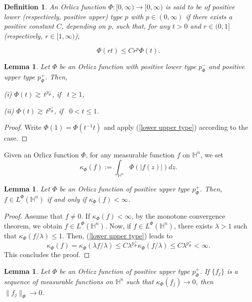 \documentclass[oneside,10pt]{article}
\newtheorem{definition}[theorem]{Definition}
\newtheorem{lemma}[theorem]{Lemma}
\begin{document}
\begin{definition} \label{positive type}
An Orlicz function $\Phi : [0, \infty) \to [0, \infty)$ is said to be of positive lower (respectively, positive upper) type $p$ with 
$p \in (0, \infty)$ if there exists a positive constant $C$, depending on $p$, such that, for any $t >0$ and $r \in (0,1]$ (respectively, 
$r \in [1, \infty)$),

\begin{equation} \label{lower upper type}
\Phi(rt) \leq C r^p \Phi(t).
\end{equation}
\end{definition}


\begin{lemma} \label{lower estim}
Let $\Phi$ be an Orlicz function with positive lower type $p_{\Phi}^{-}$ and positive upper type $p_{\Phi}^{+}$. Then,

(i) $\Phi(t) \gtrsim \, t^{p_{\Phi}^{-}}$, if \, $t \geq 1$,

(ii) $\Phi(t) \gtrsim \, t^{p_{\Phi}^{+}}$, if \, $0 < t \leq 1$.
\end{lemma}

\begin{proof}
Write $\Phi(1) = \Phi(t^{-1} t)$ and apply (\ref{lower upper type}) according to the case.
\end{proof}


Given an Orlicz function $\Phi$, for any measurable function $f$ on $\mathbb{H}^n$, we set
\[
\kappa_{\Phi}(f) := \int_{\mathbb{H}^n} \Phi(|f(z)|) dz.
\]

\begin{lemma} \label{modular 1}
Let $\Phi$ be an Orlicz function of positive upper type $p_{\Phi}^{+}$. Then, $f \in L^{\Phi}(\mathbb{H}^n)$ if and only if 
$\kappa_{\Phi}(f) < \infty$.
\end{lemma}

\begin{proof}
Assume that $f \neq 0$. If $\kappa_{\Phi}(f) < \infty$, by the monotone convergence theorem, we obtain $f \in L^{\Phi}(\mathbb{H}^n)$. Now, if 
$f \in L^{\Phi}(\mathbb{H}^n)$, there exists $\lambda > 1$ such that $\kappa_{\Phi}(f/\lambda) \leq 1$. Then, (\ref{lower upper type}) leads to
\[
\kappa_{\Phi}(f) = \kappa_{\Phi}(\lambda f/ \lambda) \leq C \lambda^{p_{\Phi}^{+}} \kappa_{\Phi}(f/\lambda) \leq C \lambda^{p_{\Phi}^{+}} < \infty. 
\]
This concludes the proof.
\end{proof}

\begin{lemma} \label{modular 2}
Let $\Phi$ be an Orlicz function of positive upper type $p_{\Phi}^{+}$. If $\{ f_j \}$ is a sequence of measurable functions on 
$\mathbb{H}^n$ such that $\kappa_{\Phi}(f_j) \to 0$, then $\| f_j \|_{\Phi} \to 0$.
\end{lemma}
\end{document}
